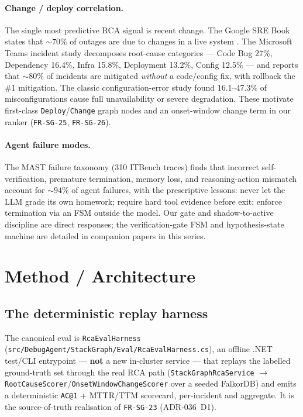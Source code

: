 \documentclass[11pt]{article}
\makeatletter
\newcommand{\acone}{\texttt{AC@1}}
\newcommand{\code}[1]{\texttt{#1}}
\makeatother
\begin{document}
\paragraph{Change / deploy correlation.}
The single most predictive RCA signal is recent change. The Google SRE Book states that
${\sim}70\%$ of outages are due to changes in a live system \citep{beyer2016sre}. The
Microsoft Teams incident study \citep{ghosh2022teams} decomposes root-cause categories ---
Code Bug 27\%, Dependency 16.4\%, Infra 15.8\%, Deployment 13.2\%, Config 12.5\% --- and
reports that ${\sim}80\%$ of incidents are mitigated \emph{without} a code/config fix, with
rollback the \#1 mitigation. The classic configuration-error study \citep{yin2011config}
found 16.1--47.3\% of misconfigurations cause full unavailability or severe degradation.
These motivate first-class \code{Deploy}/\code{Change} graph nodes and an onset-window
change term in our ranker (\code{FR-SG-25}, \code{FR-SG-26}).

\paragraph{Agent failure modes.}
The MAST failure taxonomy \citep{cemri2025mast} (310 ITBench traces) finds that incorrect
self-verification, premature termination, memory loss, and reasoning-action mismatch
account for ${\sim}94\%$ of agent failures, with the prescriptive lessons: never let the LLM
grade its own homework; require hard tool evidence before exit; enforce termination via an
FSM outside the model. Our gate and shadow-to-active discipline are direct responses; the
verification-gate FSM and hypothesis-state machine are detailed in companion papers in this
series.

\section{Method / Architecture}
\label{sec:method}

\subsection{The deterministic replay harness}
\label{sec:harness}

The canonical eval is \code{RcaEvalHarness}
(\code{src/DebugAgent/StackGraph/Eval/RcaEvalHarness.cs}), an offline .NET test/CLI
entrypoint --- \textbf{not} a new in-cluster service --- that replays the labelled
ground-truth set through the real RCA path (\code{StackGraphRcaService} $\rightarrow$
\code{RootCauseScorer}/\code{OnsetWindowChangeScorer} over a seeded FalkorDB) and emits a
deterministic \acone{} + MTTR/TTM scorecard, per-incident and aggregate. It is the
source-of-truth realisation of \code{FR-SG-23} (ADR-036~D1).
\end{document}
